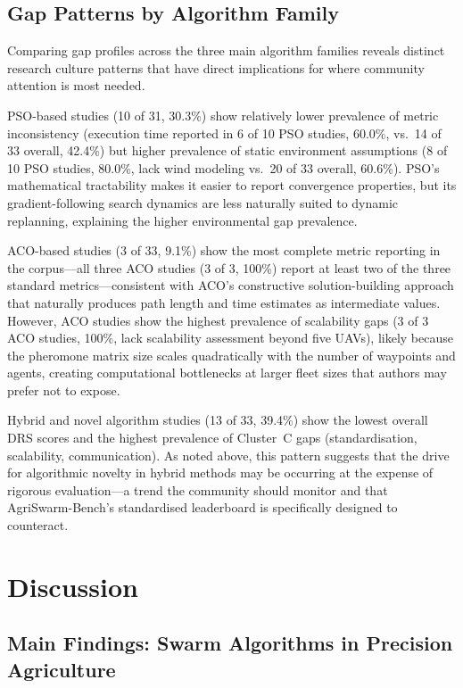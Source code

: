 \documentclass[review,3p,times]{elsarticle}
\begin{document}
\begin{itemize}
{\subsection{Gap Patterns by Algorithm Family}

Comparing gap profiles across the three main algorithm families reveals distinct research culture patterns that have direct implications for where community attention is most needed.

PSO-based studies (10 of 31, 30.3\%) show relatively lower prevalence of metric inconsistency (execution time reported in 6 of 10 PSO studies, 60.0\%, vs.\ 14 of 33 overall, 42.4\%) but higher prevalence of static environment assumptions (8 of 10 PSO studies, 80.0\%, lack wind modeling vs.\ 20 of 33 overall, 60.6\%). PSO's mathematical tractability makes it easier to report convergence properties, but its gradient-following search dynamics are less naturally suited to dynamic replanning, explaining the higher environmental gap prevalence.

ACO-based studies (3 of 33, 9.1\%) show the most complete metric reporting in the corpus---all three ACO studies (3 of 3, 100\%) report at least two of the three standard metrics---consistent with ACO's constructive solution-building approach that naturally produces path length and time estimates as intermediate values. However, ACO studies show the highest prevalence of scalability gaps (3 of 3 ACO studies, 100\%, lack scalability assessment beyond five UAVs), likely because the pheromone matrix size scales quadratically with the number of waypoints and agents, creating computational bottlenecks at larger fleet sizes that authors may prefer not to expose.

Hybrid and novel algorithm studies (13 of 33, 39.4\%) show the lowest overall DRS scores and the highest prevalence of Cluster~C gaps (standardisation, scalability, communication). As noted above, this pattern suggests that the drive for algorithmic novelty in hybrid methods may be occurring at the expense of rigorous evaluation---a trend the community should monitor and that AgriSwarm-Bench's standardised leaderboard is specifically designed to counteract.


\section{Discussion}
\label{sec:discussion}

\subsection{Main Findings: Swarm Algorithms in Precision Agriculture}

}
\end{itemize}
\end{document}
